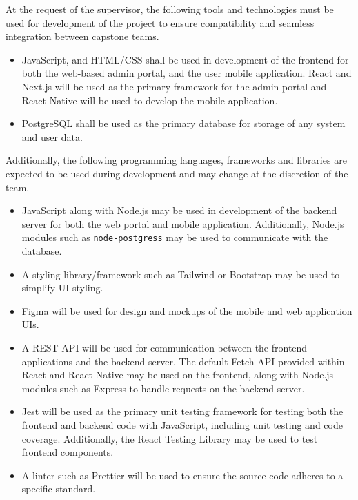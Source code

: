 \documentclass{article}
\begin{document}
\begin{flushleft}
At the request of the supervisor, the following tools and technologies must be used for development of the project to ensure compatibility and seamless integration between capstone teams.
\begin{itemize}
    \item JavaScript, and HTML/CSS shall be used in development of the frontend for both the web-based admin portal, and the user mobile application.
    React and Next.js will be used as the primary framework for the admin portal and React Native will be used to develop the mobile application.
    \item PostgreSQL shall be used as the primary database for storage of any system and user data.
\end{itemize}

Additionally, the following programming languages, frameworks and libraries are expected to be used during development and may change at the discretion of the team.
\begin{itemize}
    \item JavaScript along with Node.js may be used in development of the backend server for both the web portal and mobile application.
      Additionally, Node.js modules such as \texttt{node-postgress} may be used to communicate with the database.
    \item A styling library/framework such as Tailwind or Bootstrap may be used to simplify UI styling.
    \item Figma will be used for design and mockups of the mobile and web application UIs.
    \item A REST API will be used for communication between the frontend applications and the backend server.
    The default Fetch API provided within React and React Native may be used on the frontend, along with Node.js modules such as Express to handle requests on the backend server.
    \item Jest will be used as the primary unit testing framework for testing both the frontend and backend code with JavaScript, including unit testing and code coverage.
    Additionally, the React Testing Library may be used to test frontend components.
    \item A linter such as Prettier will be used to ensure the source code adheres to a specific standard.
\end{itemize}


\end{flushleft}
\end{document}

